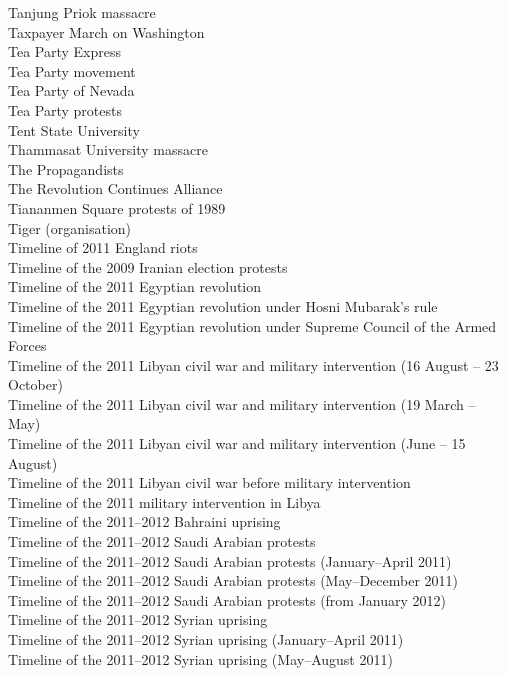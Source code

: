 Tanjung Priok massacre\\
Taxpayer March on Washington\\
Tea Party Express\\
Tea Party movement\\
Tea Party of Nevada\\
Tea Party protests\\
Tent State University\\
Thammasat University massacre\\
The Propagandists\\
The Revolution Continues Alliance\\
Tiananmen Square protests of 1989\\
Tiger (organisation)\\
Timeline of 2011 England riots\\
Timeline of the 2009 Iranian election protests\\
Timeline of the 2011 Egyptian revolution\\
Timeline of the 2011 Egyptian revolution under Hosni Mubarak's rule\\
Timeline of the 2011 Egyptian revolution under Supreme Council of the Armed Forces\\
Timeline of the 2011 Libyan civil war and military intervention (16 August – 23 October)\\
Timeline of the 2011 Libyan civil war and military intervention (19 March – May)\\
Timeline of the 2011 Libyan civil war and military intervention (June – 15 August)\\
Timeline of the 2011 Libyan civil war before military intervention\\
Timeline of the 2011 military intervention in Libya\\
Timeline of the 2011–2012 Bahraini uprising\\
Timeline of the 2011–2012 Saudi Arabian protests\\
Timeline of the 2011–2012 Saudi Arabian protests (January–April 2011)\\
Timeline of the 2011–2012 Saudi Arabian protests (May–December 2011)\\
Timeline of the 2011–2012 Saudi Arabian protests (from January 2012)\\
Timeline of the 2011–2012 Syrian uprising\\
Timeline of the 2011–2012 Syrian uprising (January–April 2011)\\
Timeline of the 2011–2012 Syrian uprising (May–August 2011)\\
